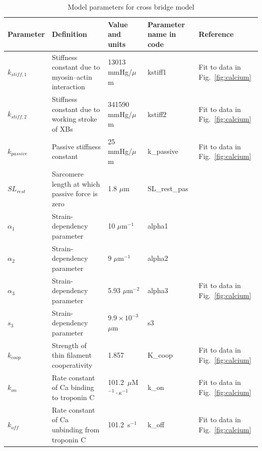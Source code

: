 \documentclass[fleqn,10pt]{physiome}
\begin{document}
\begin{table}[!htb]
\centering
\small
\caption{Model parameters for cross bridge model }\label{tab:7}

\begin{supertabular}{p{1.4cm} p{4.4cm} p{1.8cm} p{2.0cm} p{2.0cm}}
\toprule
Parameter & Definition & Value and units & Parameter name in code & Reference \\
\midrule

$k_{stiff,1}$ & 
Stiffness constant due to myosin–actin interaction & 
13013 mmHg/$\mu$m & kstiff1 & 
Fit to data in Fig.~\ref{fig:calcium} \\

$k_{stiff,2}$ & 
Stiffness constant due to working stroke of XBs & 
341590 mmHg/$\mu$m  & kstiff2 &
Fit to data in Fig.~\ref{fig:calcium}  \\

$k_{passive}$ & Passive stiffness constant &
25 mmHg/$\mu$m & k\_passive &
Fit to data in Fig.~\ref{fig:calcium}  \\

$SL_{rest}$ & 
Sarcomere length at which passive force is zero  & 
1.8 $\mu$m & 
SL\_rest\_pas &
\cite{Campbell2018} \\

$\alpha_1$ & 
Strain-dependency parameter & 
10 $\mu$m$^{-1}$ & 
alpha1 &
\cite{Tewari2016b} \\

$\alpha_2$ & 
Strain-dependency parameter & 
9 $\mu$m$^{-1}$ & 
alpha2 &
\cite{Tewari2016b} \\

$\alpha_3$ & 
Strain-dependency parameter & 
5.93 $\mu$m$^{-2}$ & 
alpha3 &
Fit to data in Fig.~\ref{fig:calcium}  \\

$s_3$ & 
Strain-dependency parameter & 
$9.9 \times 10^{-3}$ $\mu$m &
s3 &
\cite{Tewari2016b} \\

$k_{coop}$ & 
Strength of thin filament cooperativity  & 
1.857 & 
K\_coop &
Fit to data in Fig.~\ref{fig:calcium}  \\

$k_{on}$ & 
Rate constant of Ca binding to troponin C & 
101.2~$\mu$M$^{-1}\cdot$s$^{-1}$ & 
k\_on &
Fit to data in Fig.~\ref{fig:calcium}  \\

$k_{off}$ & 
 Rate constant of Ca unbinding from troponin C  & 
101.2~s$^{-1}$ & 
k\_off &
Fit to data in Fig.~\ref{fig:calcium}  \\


\end{supertabular}
\end{table}
\end{document}
